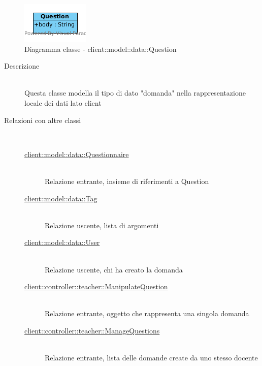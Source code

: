 \vspace{0.5cm}
\hypertarget{client::model::data::Question}{}
\begin{center}
			\begin{figure}[H]
				\centering \includegraphics[scale=4, max width=\textwidth, max height=\myheight]{../img/diagrammiClassi/client/model/data/Question.png}
				\caption{Diagramma classe - client::model::data::Question}
			\end{figure}
		\end{center}\begin{description}
\item[Descrizione] \hfill \\
 Questa classe modella il tipo di dato "domanda" nella rappresentazione locale dei dati lato client
\item[Relazioni con altre classi] \hfill \\
 \vspace{-7mm}
\begin{description}
\item[\hyperlink{client::model::data::Questionnaire}{client::model::data::Questionnaire}] \hfill \\
 Relazione entrante, insieme di riferimenti a Question
\item[\hyperlink{client::model::data::Tag}{client::model::data::Tag}] \hfill \\
 Relazione uscente, lista di argomenti  
\item[\hyperlink{client::model::data::User}{client::model::data::User}] \hfill \\
 Relazione uscente, chi ha creato la domanda
\item[\hyperlink{client::controller::teacher::ManipulateQuestion}{client::controller::teacher::ManipulateQuestion}] \hfill \\
 Relazione entrante, oggetto che rappresenta una singola domanda
\item[\hyperlink{client::controller::teacher::ManageQuestions}{client::controller::teacher::ManageQuestions}] \hfill \\
 Relazione entrante, lista delle domande create da uno stesso docente
\end{description}


\end{description}
